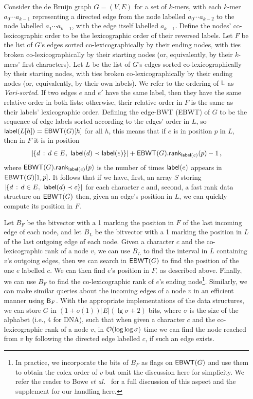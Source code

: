 Consider the de Bruijn graph \(G = (V, E)\) for a set of $k$-mers, with each $k$-mer \(a_0 \cdots a_{k - 1}\) representing a directed edge from the node labelled \(a_0 \cdots a_{k - 2}\) to the node labelled \(a_1 \cdots a_{k - 1}\), with the edge itself labelled \(a_{k - 1}\).  Define the nodes' co-lexicographic order to be the lexicographic order of their reversed labels.  Let $F$ be the list of $G$'s edges sorted co-lexicographically by their ending nodes, with ties broken co-lexicographically by their starting nodes (or, equivalently, by their $k$-mers' first characters).  Let $L$ be the list of $G$'s edges sorted co-lexicographically by their starting nodes, with ties broken co-lexicographically by their ending nodes (or, equivalently, by their own labels). We refer to the ordering of $\mbox{\rm {\sf L}}$ as {\em Vari-sorted}. If two edges $e$ and $e'$ have the same label, then they have the same relative order in both lists; otherwise, their relative order in $F$ is the same as their labels' lexicographic order.  Defining the edge-BWT (EBWT) of $G$ to be the sequence of edge labels sorted according to the edges' order in $L$, so \(\mathsf{label} (L [h]) = \mathsf{EBWT} (G) [h]\) for all $h$, this means that if $e$ is in position $p$ in $L$, then in $F$ it is in position
\begin{equation*}
|\{d\,:\,d \in E,\ \elabel (d) \prec \elabel (e)\}| + \EBWT (G).\rank_{\elabel (e)} (p) - 1\,,
\end{equation*}
where \(\mathsf{EBWT} (G).\textsf{rank}_{\mathsf{label} (e)} (p)\) is the number of times $\mathsf{label} (e)$ appears in \(\mathsf{EBWT} (G) [1,p]\).  It follows that if we have, first, an array $S$ storing \(|\{d\,:\,d \in E,\ \mathsf{label} (d) \prec c\}|\)
for each character $c$ and, second, a fast rank data structure on \(\mathsf{EBWT} (G)\) then, given an edge's position in $L$, we can quickly compute its position in $F$.

Let $B_F$ be the bitvector with a 1 marking the position in $F$ of the last incoming edge of each node, and let $B_L$ be the bitvector with a 1 marking the position in $L$ of the last outgoing edge of each node.  Given a character $c$ and the co-lexicographic rank of a node $v$, we can use $B_L$ to find the interval in $L$ containing $v$'s outgoing edges, then we can search in \(\mathsf{EBWT} (G)\) to find the position of the one $e$ labelled $c$.  We can then find $e$'s position in $F$, as described above.  Finally, we can use $B_F$ to find the co-lexicographic rank of $e$'s ending node\footnote{In practice, we incorporate the bits of $B_F$ as flags on \(\mathsf{EBWT} (G)\) and use them to obtain the colex order of $v$ but omit the discussion here for simplicity.  We refer the reader to Bowe {\it et al.}~\cite{BOSS12} for a full discussion of this aspect and the supplement for our handling here.}.  Similarly, we can make similar queries about the incoming edges of a node $v$ in an efficient manner using $\mathsf{B}_F$.  With the appropriate implementations of the data structures, we can store $G$ in \((1 + o (1)) |E| (\lg \sigma + 2)\) bits, where $\sigma$ is the size of the alphabet (i.e., 4 for DNA), such that when given a character $c$ and the co-lexicographic rank of a node $v$, in $\mathcal{O}\!\left({\log \log \sigma}\right)$ time we can find the node reached from $v$ by following the directed edge labelled $c$, if such an edge exists.

